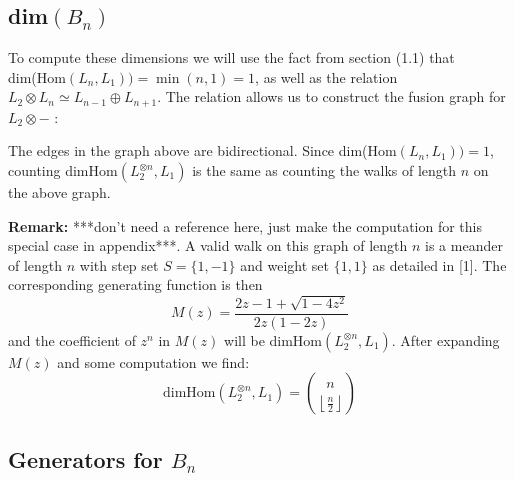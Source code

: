 \documentclass[11pt]{article} %
\begin{document}
\subsection{dim$(B_n)$}
To compute these dimensions we will use the fact from section (1.1) that dim(Hom$(L_n,L_1)) = \min(n,1) = 1$, as well as the relation  $L_2 \otimes L_n \simeq L_{n-1} \oplus L_{n+1}$. The relation allows us to construct the fusion graph for $L_2 \otimes -$ :

The edges in the graph above are bidirectional. Since dim(Hom$(L_n,L_1)) = 1$, counting dimHom$(L_2^{\otimes n}, L_1)$ is the same as counting the walks of length $n$ on the above graph. 

\noindent \textbf{Remark:} ***don't need a reference here, just make the computation for this special case in appendix***. A valid walk on this graph of length $n$ is a meander of length $n$ with step set $S = \{1,-1\}$ and weight set $\{1,1\}$ as detailed in [1]. The corresponding generating function is then $$M(z) = \frac{2z - 1 + \sqrt{1-4z^2}}{2z(1-2z)}$$ and the coefficient of $z^n$ in $M(z)$ will be dimHom$(L_2^{\otimes n}, L_1)$. After expanding $M(z)$ and some computation we find: 
$$\text{dimHom}(L_2^{\otimes n}, L_1) = {n\choose{\left \lfloor{\frac{n}{2}}\right \rfloor}}$$

\subsection{Generators for $B_n$}
\end{document}
